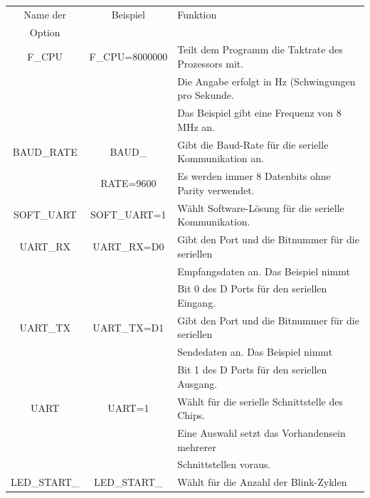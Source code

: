 \begin{table}[H]
  \begin{center}
    \begin{tabular}{| c | c | l |}
    \hline
   Name der        & Beispiel       & Funktion                                            \\
    Option         &                &                                                     \\
    \hline
    \hline
    F\_CPU         & F\_CPU=8000000 & Teilt dem Programm die Taktrate des Prozessors mit. \\
                   &                & Die Angabe erfolgt in Hz (Schwingungen pro Sekunde. \\
                   &                & Das Beispiel gibt eine Frequenz von 8 MHz an. \\
    \hline
    BAUD\_RATE     & BAUD\_         & Gibt die Baud-Rate für die serielle Kommunikation an. \\
                   &  RATE=9600      & Es werden immer 8 Datenbits ohne Parity verwendet. \\
    \hline
    SOFT\_UART     & SOFT\_UART=1   & Wählt Software-Lösung für die serielle Kommunikation. \\
    \hline
    UART\_RX        & UART\_RX=D0   & Gibt den Port und die Bitnummer für die seriellen  \\
                   &                & Empfangsdaten an. Das Beispiel nimmt               \\
                   &                & Bit 0 des D Ports für den seriellen Eingang.\\
    \hline
    UART\_TX        & UART\_TX=D1   & Gibt den Port und die Bitnummer für die seriellen  \\
                   &                & Sendedaten an.  Das Beispiel nimmt                 \\
                   &                & Bit 1 des D Ports für den seriellen Ausgang.\\
    \hline
    UART           & UART=1         & Wählt für die  serielle Schnittstelle des Chips. \\
                   &                & Eine Auswahl setzt das Vorhandensein mehrerer \\
                   &                & Schnittstellen voraus. \\
    \hline
 LED\_START\_      & LED\_START\_   & Wählt für die Anzahl der Blink-Zyklen \\

\end{tabular}
\end{center}
\end{table}
